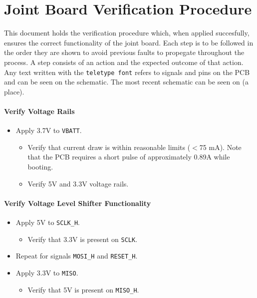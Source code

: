 \section{Joint Board Verification Procedure} %
\label{sec:joint_board_verification_procedure}
This document holds the verification procedure which, when applied succesfully, ensures the correct functionality of the joint board.
Each step is to be followed in the order they are shown to avoid previous faults to propegate throughout the process.
A step consists of an action and the expected outcome of that action.
Any text written with the \texttt{teletype font} refers to signals and pins on the PCB and can be seen on the schematic.
The most recent schematic can be seen on (a place).
\paragraph{Verify Voltage Rails} %
 \label{par:verify_voltage_rails}
 \begin{itemize}
 	\item Apply 3.7V to \texttt{VBATT}.
 	\begin{itemize}
 		\item Verify that current draw is within reasonable limits ($<$75 mA). Note that the PCB requires a short pulse of approximately 0.89A while booting.
 		\item Verify 5V and 3.3V voltage rails.
 	\end{itemize}
 \end{itemize}

\paragraph{Verify Voltage Level Shifter Functionality} %
\label{par:verify_voltage_level_shifter_functionality}
\begin{itemize}
	\item Apply 5V to \texttt{SCLK\_H}.
	\begin{itemize}
		\item  Verify that 3.3V is present on \texttt{SCLK}.
	\end{itemize}
	\item Repeat for signals \texttt{MOSI\_H} and \texttt{RESET\_H}.
	\item Apply 3.3V to \texttt{MISO}.
	\begin{itemize}
		\item  Verify that 5V is present on \texttt{MISO\_H}.
	\end{itemize}
\end{itemize}

